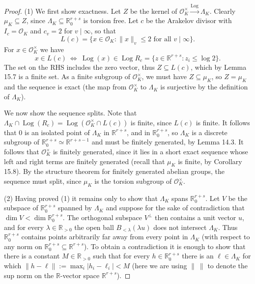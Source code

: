 \begin{proof}
(1) We first show exactness. Let $Z$ be the kernel of $\mathcal O_K^\times\xrightarrow{\operatorname{Log}}\Lambda_K$. Clearly $\mu_K\subseteq Z$, since $\Lambda_K\subseteq\mathbb R^{r+s}_0$ is torsion free. Let $c$ be the Arakelov divisor with $I_c=\mathcal O_K$ and $c_v=2$ for $v\mid\infty$, so that
\[
L(c)=\{x\in\mathcal O_K:\|x\|_v\leq2\text{ for all }v\mid\infty\}.
\]
For $x\in\mathcal O_K^\times$ we have
\[
x\in L(c)\ \Longleftrightarrow\ \operatorname{Log}(x)\in\operatorname{Log}R_c
=\{z\in\mathbb R^{r+s}:z_i\leq\log2\}.
\]
The set on the RHS includes the zero vector, thus $Z\subseteq L(c)$, which by Lemma 15.7 is a finite set. As a finite subgroup of $\mathcal O_K^\times$, we must have $Z\subseteq\mu_K$, so $Z=\mu_K$ and the sequence is exact (the map from $\mathcal O_K^\times$ to $\Lambda_K$ is surjective by the definition of $\Lambda_K$).

We now show the sequence splits. Note that
$\Lambda_K\cap\operatorname{Log}(R_c)=\operatorname{Log}(\mathcal O_K^\times\cap L(c))$ is finite, since $L(c)$ is finite. It follows that $0$ is an isolated point of $\Lambda_K$ in $\mathbb R^{r+s}$, and in $\mathbb R^{r+s}_0$, so $\Lambda_K$ is a discrete subgroup of $\mathbb R^{r+s}_0\simeq\mathbb R^{r+s-1}$ and must be finitely generated, by Lemma 14.3. It follows that $\mathcal O_K^\times$ is finitely generated, since it lies in a short exact sequence whose left and right terms are finitely generated (recall that $\mu_K$ is finite, by Corollary 15.8). By the structure theorem for finitely generated abelian groups, the sequence must split, since $\mu_K$ is the torsion subgroup of $\mathcal O_K^\times$.

(2) Having proved (1) it remains only to show that $\Lambda_K$ spans $\mathbb R^{r+s}_0$. Let $V$ be the subspace of $\mathbb R^{r+s}_0$ spanned by $\Lambda_K$ and suppose for the sake of contradiction that $\dim V<\dim\mathbb R^{r+s}_0$. The orthogonal subspace $V^\perp$ then contains a unit vector $u$, and for every $\lambda\in\mathbb R_{>0}$ the open ball $B_{<\lambda}(\lambda u)$ does not intersect $\Lambda_K$. Thus $\mathbb R^{r+s}_0$ contains points arbitrarily far away from every point in $\Lambda_K$ (with respect to any norm on $\mathbb R^{r+s}_0\subseteq\mathbb R^{r+s}$). To obtain a contradiction it is enough to show that there is a constant $M\in\mathbb R_{>0}$ such that for every $h\in\mathbb R^{r+s}_0$ there is an $\ell\in\Lambda_K$ for which $\|h-\ell\|:=\max_i|h_i-\ell_i|<M$ (here we are using $\|\ \|$ to denote the sup norm on the $\mathbb R$-vector space $\mathbb R^{r+s}$).


\end{proof}
